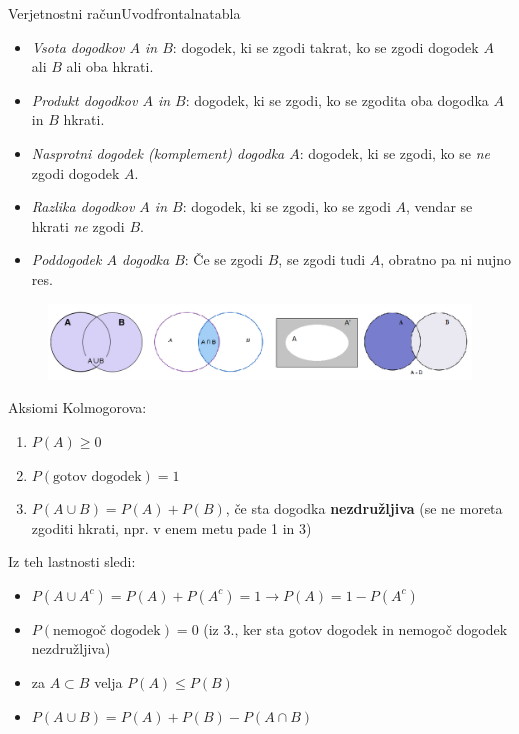 \begin{priprava}{}{}{Verjetnostni račun}{Uvod}{frontalna}{tabla}
\begin{itemize}
    \item \emph{Vsota dogodkov $ A $ in $ B $}: dogodek, ki se zgodi takrat, ko se zgodi dogodek $ A $ ali $ B $ ali oba hkrati.
    \item \emph{Produkt dogodkov $ A $ in $ B $}: dogodek, ki se zgodi, ko se zgodita oba dogodka $ A $ in $ B $ hkrati.
    \item \emph{Nasprotni dogodek (komplement) dogodka $ A $}: dogodek, ki se zgodi, ko se \emph{ne} zgodi dogodek $ A $. 
    \item \emph{Razlika dogodkov $ A $ in $ B $}: dogodek, ki se zgodi, ko se zgodi $ A $, vendar se hkrati \emph{ne} zgodi $ B $.
    \item \emph{Poddogodek $ A $ dogodka $ B $}: Če se zgodi $ B $, se zgodi tudi $ A $, obratno pa ni nujno res.
\end{itemize}

\newpage

\begin{figure}[h]
    \centering
    \includegraphics[width=\textwidth]{slike/dogodki.png}
\end{figure}

Aksiomi Kolmogorova: 
\begin{enumerate}
    \item $ P(A) \geq 0 $
    \item $ P(\text{gotov dogodek}) = 1 $
    \item $ P(A \cup B) = P(A) + P(B) $, če sta dogodka \textbf{nezdružljiva} (se ne moreta zgoditi hkrati, npr. v enem metu pade 1 in 3)
\end{enumerate}
Iz teh lastnosti sledi: 
\begin{itemize}
    \item $ P(A \cup A^c) = P(A) + P(A^c) = 1 \rightarrow P(A) = 1 - P(A^c) $
    \item $ P(\text{nemogoč dogodek}) = 0 $ (iz 3., ker sta gotov dogodek in nemogoč dogodek nezdružljiva)
    \item za $ A \subset B $ velja $ P(A) \leq P(B) $ 
    \item $ P(A \cup B) = P(A) + P(B) - P(A \cap B) $ 
\end{itemize}
    

\end{priprava}